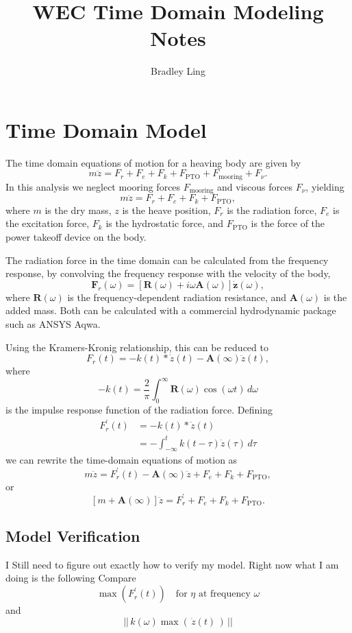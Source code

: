 \documentclass[12pt]{article}
\title{WEC Time Domain Modeling Notes}
\author{Bradley Ling}
\begin{document}
\maketitle

\section{Time Domain Model}

The time domain equations of motion for a heaving body are given by
\[
	m \ddot{z} = F_r + F_e + F_k + F_{\text{PTO}} + F_{\text{mooring}} + F_{\nu}.
\]
In this analysis we neglect mooring forces $F_{\text{mooring}}$ and viscous forces $F_{\nu}$, yielding
\[
	m \ddot{z} = F_r + F_e + F_k + F_{\text{PTO}},
\]
where $m$ is the dry mass, $z$ is the heave position, $F_r$ is the radiation force, $F_e$ is the excitation force, $F_k$ is the hydrostatic force, and $F_{\text{PTO}}$ is the force of the power takeoff device on the body.

The radiation force in the time domain can be calculated from the frequency response, by convolving the frequency response with the velocity of the body,
\[
	\mathbf{F}_r(\omega) = [\mathbf{R}(\omega) + i \omega \mathbf{A}(\omega)] \mathbf{\dot{z}}(\omega),
\]
where $\mathbf{R}(\omega)$ is the frequency-dependent radiation resistance, and $\mathbf{A}(\omega)$ is the added mass. Both can be calculated with a commercial hydrodynamic package such as ANSYS Aqwa.

Using the Kramers-Kronig relationship, this can be reduced to
\[
	F_r(t) = - k(t) * \dot{z}(t) - \mathbf{A}(\infty) \ddot{z}(t),
\]
where
\[
	-k(t) = \frac{2}{\pi} \int_0^\infty \mathbf{R}(\omega) \cos(\omega t)  \, d \omega
\]
is the impulse response function of the radiation force.
Defining
\begin{align*}
	F_r^\prime(t) &= - k(t) * \dot{z}(t) \\
	&=  - \int_{-\infty}^t  k(t-\tau) \dot{z}(\tau) \, d \tau
\end{align*}
we can rewrite the time-domain equations of motion as
\[
	m \ddot{z} = F_r^\prime(t) - \mathbf{A}(\infty) \ddot{z} + F_e + F_k + F_{\text{PTO}},
\]
or
\[
	[m + \mathbf{A}(\infty)] \ddot{z} = F_r^\prime + F_e + F_k + F_{\text{PTO}}.
\]


\subsection*{Model Verification}

I Still need to figure out exactly how to verify my model.
Right now what I am doing is the following
Compare
\[
	\max (F_r^\prime (t)) \quad \text{for }\eta\text{ at frequency }\omega
\]
and
\[
	\big|\big| \, k(\omega) \max( \, \dot{z}(t) \, ) \, \big|\big|
\]
\end{document}
